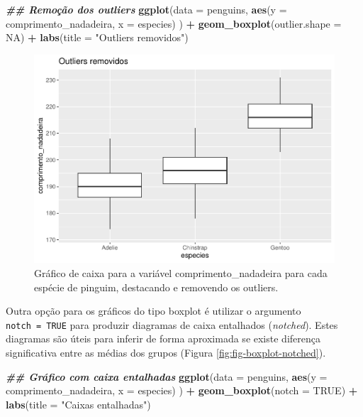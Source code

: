 \documentclass[
]{article}
\newenvironment{Shaded}{\begin{snugshade}}{\end{snugshade}}
\newcommand{\AttributeTok}[1]{\textcolor[rgb]{0.13,0.29,0.53}{#1}}
\newcommand{\ConstantTok}[1]{\textcolor[rgb]{0.56,0.35,0.01}{#1}}
\newcommand{\DocumentationTok}[1]{\textcolor[rgb]{0.56,0.35,0.01}{\textbf{\textit{#1}}}}
\newcommand{\FunctionTok}[1]{\textcolor[rgb]{0.13,0.29,0.53}{\textbf{#1}}}
\newcommand{\NormalTok}[1]{#1}
\newcommand{\SpecialCharTok}[1]{\textcolor[rgb]{0.81,0.36,0.00}{\textbf{#1}}}
\newcommand{\StringTok}[1]{\textcolor[rgb]{0.31,0.60,0.02}{#1}}
\begin{document}
\begin{Shaded}
\begin{Highlighting}[]
\DocumentationTok{\#\# Remoção dos outliers}
\FunctionTok{ggplot}\NormalTok{(}\AttributeTok{data =}\NormalTok{ penguins, }
       \FunctionTok{aes}\NormalTok{(}\AttributeTok{y =}\NormalTok{ comprimento\_nadadeira, }\AttributeTok{x =}\NormalTok{ especies)}
\NormalTok{       ) }\SpecialCharTok{+}
    \FunctionTok{geom\_boxplot}\NormalTok{(}\AttributeTok{outlier.shape =} \ConstantTok{NA}\NormalTok{) }\SpecialCharTok{+}
    \FunctionTok{labs}\NormalTok{(}\AttributeTok{title =} \StringTok{"Outliers removidos"}\NormalTok{)}
\end{Highlighting}
\end{Shaded}

\begin{figure}
\includegraphics[width=0.75\linewidth,height=0.75\textheight]{epr_files/figure-latex/fig-boxplot-outlier-2} \caption{Gráfico de caixa para a variável comprimento_nadadeira para cada espécie de pinguim, destacando e removendo os outliers.}\label{fig:fig-boxplot-outlier-2}
\end{figure}

Outra opção para os gráficos do tipo boxplot é utilizar o argumento \texttt{notch\ =\ TRUE} para produzir diagramas de caixa entalhados (\emph{notched}). Estes diagramas são úteis para inferir de forma aproximada se existe diferença significativa entre as médias dos grupos (Figura \ref{fig:fig-boxplot-notched}).

\begin{Shaded}
\begin{Highlighting}[]
\DocumentationTok{\#\# Gráfico com caixa entalhadas}
\FunctionTok{ggplot}\NormalTok{(}\AttributeTok{data =}\NormalTok{ penguins, }
       \FunctionTok{aes}\NormalTok{(}\AttributeTok{y =}\NormalTok{ comprimento\_nadadeira, }\AttributeTok{x =}\NormalTok{ especies)}
\NormalTok{       ) }\SpecialCharTok{+}
    \FunctionTok{geom\_boxplot}\NormalTok{(}\AttributeTok{notch =} \ConstantTok{TRUE}\NormalTok{) }\SpecialCharTok{+}
    \FunctionTok{labs}\NormalTok{(}\AttributeTok{title =} \StringTok{"Caixas entalhadas"}\NormalTok{)}
\end{Highlighting}
\end{Shaded}
\end{document}
